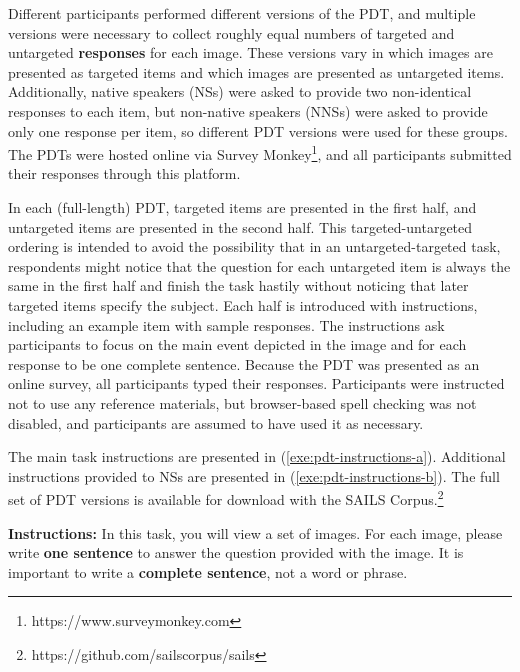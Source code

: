 Different participants performed different versions of the PDT, and multiple versions were necessary to collect roughly equal numbers of targeted and untargeted \textbf{responses} for each image. These versions vary in which images are presented as targeted items and which images are presented as untargeted items. Additionally, native speakers (NSs) were asked to provide two non-identical responses to each item, but non-native speakers (NNSs) were asked to provide only one response per item, so different PDT versions were used for these groups. The PDTs were hosted online via Survey Monkey\footnote{https://www.surveymonkey.com}, and all participants submitted their responses through this platform. %

In each (full-length) PDT, targeted items are presented in the first half, and untargeted items are presented in the second half. This targeted-untargeted ordering is intended to avoid the possibility that in an untargeted-targeted task, respondents might notice that the question for each untargeted item is always the same in the first half and finish the task hastily without noticing that later targeted items specify the subject. Each half is introduced with instructions, including an example item with sample responses. The instructions ask participants to focus on the main event depicted in the image and for each response to be one complete sentence. Because the PDT was presented as an online survey, all participants typed their responses. Participants were instructed not to use any reference materials, but browser-based spell checking was not disabled, and participants are assumed to have used it as necessary.

The main task instructions are presented in (\ref{exe:pdt-instructions-a}). Additional instructions provided to NSs are presented in (\ref{exe:pdt-instructions-b}). The full set of PDT versions is available for download with the SAILS Corpus.\footnote{https://github.com/sailscorpus/sails}

\begin{exe}
  \ex\label{exe:pdt-instructions-a}\textbf{Instructions:} In this task, you will view a set of images. For each image, please write \textbf{one sentence} to answer the question provided with the image. It is important to write a \textbf{complete sentence}, not a word or phrase.
\end{exe}

